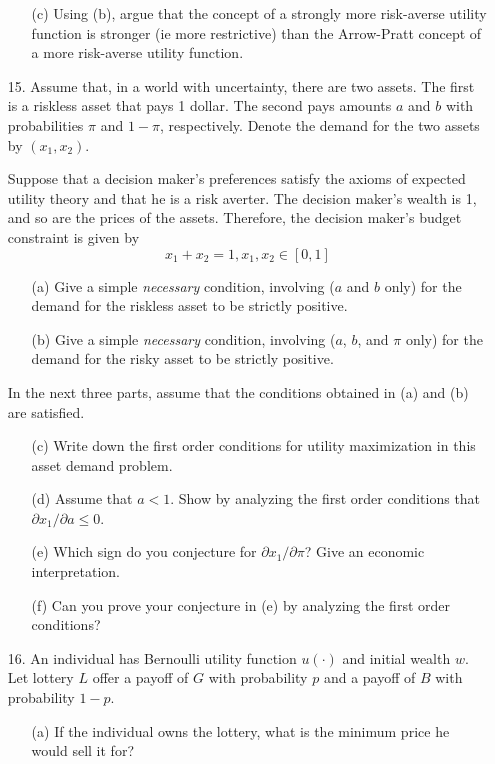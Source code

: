 \documentclass[12pt]{article}
\begin{document}
\begin{itemize}
\begin{itemize}
		\item[(c)] Using (b), argue that the concept of a strongly more risk-averse utility function is stronger (ie more restrictive) than the Arrow-Pratt concept of a more risk-averse utility function.
	\end{itemize}
	\item[15.] Assume that, in a world with uncertainty, there are two assets. The first is a riskless asset that pays 1 dollar. The second pays amounts $a$ and $b$ with probabilities $\pi$ and $1-\pi$, respectively. Denote the demand for the two assets by $(x_1,x_2)$. 
	
	Suppose that a decision maker's preferences satisfy the axioms of expected utility theory and that he is a risk averter. The decision maker's wealth is 1, and so are the prices of the assets. Therefore, the decision maker's budget constraint is given by
	\[
	x_1 + x_2 = 1, x_1,x_2 \in [0,1]
	\]
	\begin{itemize}
		\item[(a)] Give a simple \emph{necessary} condition, involving ($a$ and $b$ only) for the demand for the riskless asset to be strictly positive.
		\item[(b)] Give a simple \emph{necessary} condition, involving ($a$, $b$, and $\pi$ only) for the demand for the risky asset to be strictly positive.
	\end{itemize}
	In the next three parts, assume that the conditions obtained in (a) and (b) are satisfied.
	\begin{itemize}
		\item[(c)] Write down the first order conditions for utility maximization in this asset demand problem.
		\item[(d)] Assume that $a < 1$. Show by analyzing the first order conditions that $\partial x_1 / \partial a \le 0$. 
		\item[(e)] Which sign do you conjecture for $\partial x_1 / \partial \pi$? Give an economic interpretation.
		\item[(f)] Can you prove your conjecture in (e) by analyzing the first order conditions?
	\end{itemize}
	\item[16.] An individual has Bernoulli utility function $u(\cdot)$ and initial wealth $w$. Let lottery $L$ offer a payoff of $G$ with probability $p$ and a payoff of $B$ with probability $1-p$.
	\begin{itemize}
		\item[(a)] If the individual owns the lottery, what is the minimum price he would sell it for?

\end{itemize}
\end{itemize}
\end{document}
